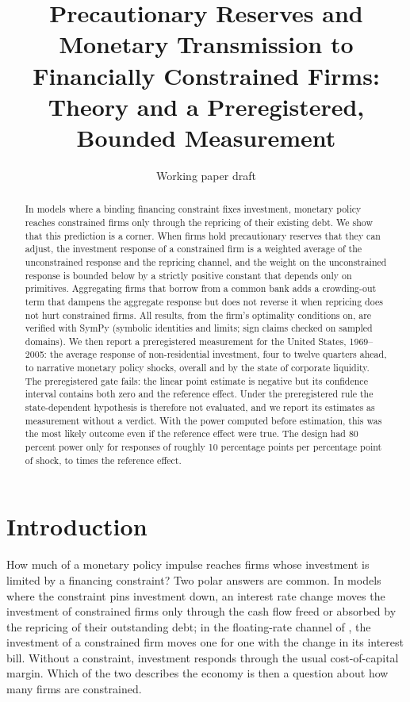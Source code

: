 \documentclass[11pt]{article}
\title{Precautionary Reserves and Monetary Transmission to Financially Constrained Firms:\\
Theory and a Preregistered, Bounded Measurement}
\author{\todo{author list and affiliations}}
\date{Working paper draft}
\theoremstyle{remark}
\begin{document}
\maketitle

\begin{abstract}
\noindent
In models where a binding financing constraint fixes investment, monetary policy reaches constrained firms only through
the repricing of their existing debt. We show that this prediction is a corner. When firms hold precautionary reserves that
they can adjust, the investment response of a constrained firm is a weighted average of the unconstrained response and the
repricing channel, and the weight on the unconstrained response is bounded below by a strictly positive constant that
depends only on primitives. Aggregating firms that borrow from a common bank adds a crowding-out term that dampens the aggregate
response but does not reverse it when repricing does not hurt constrained firms. All results, from the firm's optimality conditions on, are verified with SymPy (symbolic
identities and limits; sign claims checked on sampled domains). We then report a preregistered measurement for
the United States, 1969--2005: the average response of non-residential investment, four to twelve quarters ahead, to
narrative monetary policy shocks, overall and by the state of corporate liquidity. The preregistered gate fails: the
linear point estimate is negative but its confidence interval contains both zero and the reference effect. Under the
preregistered rule the state-dependent hypothesis is therefore not evaluated, and we report its estimates as measurement
without a verdict. With the power computed before estimation, this was the most likely outcome even if the reference effect
were true. The design had 80 percent power only for responses of roughly 10 percentage points per percentage point of
shock, \MdeHetC{} to \MdeHomoC{} times the reference effect.
\end{abstract}

\section{Introduction}\label{sec:intro}

How much of a monetary policy impulse reaches firms whose investment is limited by a financing constraint? Two polar answers
are common. In models where the constraint pins investment down, an interest rate change moves the investment of
constrained firms only through the cash flow freed or absorbed by the repricing of their outstanding debt; in the floating-rate
channel of \citet[WP pp.~10--11]{IppolitoOzdagliPerezOrive2018}, the investment of a constrained firm moves one for one
with the change in its interest bill. Without a constraint, investment responds through the usual cost-of-capital margin.
Which of the two describes the economy is then a question about how many firms are constrained.
\end{document}
